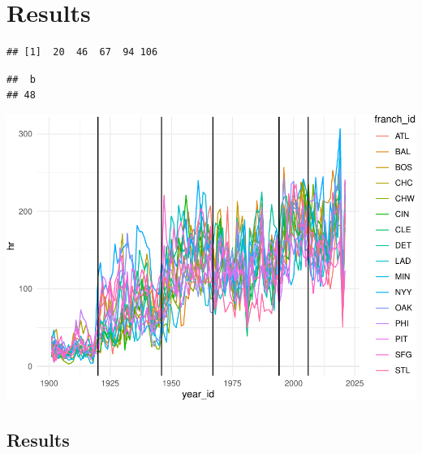 \documentclass[
  12pt,
]{article}
\begin{document}
\hypertarget{results}{%
\section{Results}\label{results}}

\begin{verbatim}
## [1]  20  46  67  94 106
\end{verbatim}

\begin{verbatim}
##  b 
## 48
\end{verbatim}

\begin{center}\includegraphics{paper_files/figure-latex/unnamed-chunk-1-1} \end{center}

\hypertarget{results-1}{%
\subsection{Results}\label{results-1}}
\end{document}
